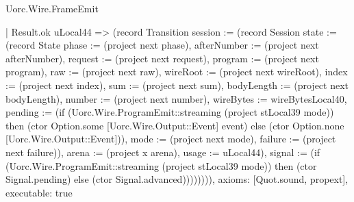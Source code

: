 \begin{lexlean}{Uorc.Wire.FrameEmit}
\begin{semanticmodule}
{        | Result.ok uLocal44 => (record Transition {session := (record Session {state := (record State {phase := (project next phase), afterNumber := (project next afterNumber), request := (project next request), program := (project next program), raw := (project next raw), wireRoot := (project next wireRoot), index := (project next index), sum := (project next sum), bodyLength := (project next bodyLength), number := (project next number), wireBytes := wireBytesLocal40, pending := (if (Uorc.Wire.ProgramEmit::streaming (project stLocal39 mode)) then (ctor Option.some [Uorc.Wire.Output::Event] event) else (ctor Option.none [Uorc.Wire.Output::Event])), mode := (project next mode), failure := (project next failure)}), arena := (project x arena), usage := uLocal44}), signal := (if (Uorc.Wire.ProgramEmit::streaming (project stLocal39 mode)) then (ctor Signal.pending) else (ctor Signal.advanced))})))))),
  axioms: [Quot.sound, propext],
  executable: true
}


\end{semanticmodule}
\end{lexlean}
